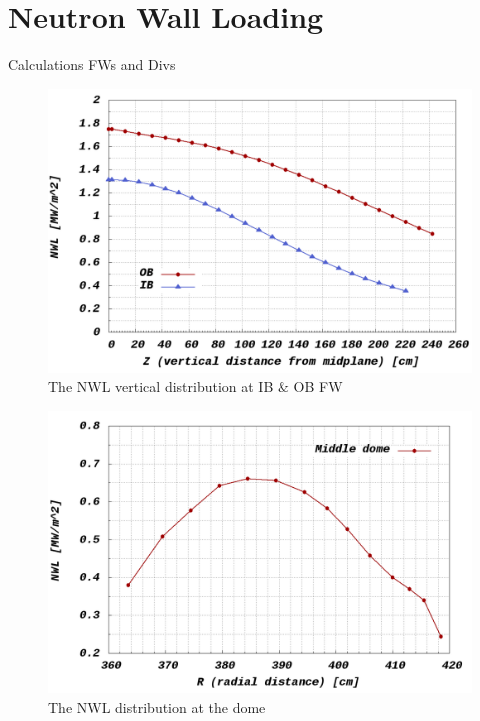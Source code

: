 \documentclass[12pt, letterpaper]{elsarticle}
\begin{document}
\section{Neutron Wall Loading} \label{Neutron Wall Loading}
Calculations FWs and Divs
\begin{figure}[h!]
  \centering
  \includegraphics[scale=0.2]{../plots/NWL_FWs.png}
  \caption{The NWL vertical distribution at IB $\&$ OB FW}
  \label{fig:NWL FWs}
\end{figure}
\begin{figure}[h!]
  \centering
  \includegraphics[scale=0.2]{../plots/NWL_div.png}
  \caption{The NWL distribution at the dome}
  \label{fig:NWL Dome}
\end{figure}
\end{document}
